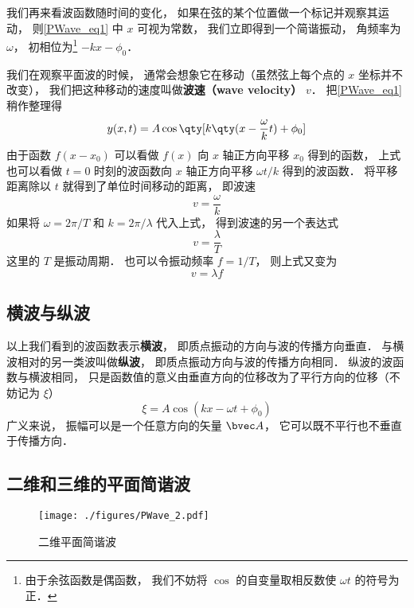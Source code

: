 我们再来看波函数随时间的变化， 如果在弦的某个位置做一个标记并观察其运动， 则\autoref{PWave_eq1} 中 $x$ 可视为常数， 我们立即得到一个简谐振动， 角频率为 $\omega$， 初相位为\footnote{由于余弦函数是偶函数， 我们不妨将 $\cos$ 的自变量取相反数使 $\omega t$ 的符号为正．} $-kx - \phi_0$．

我们在观察平面波的时候， 通常会想象它在移动（虽然弦上每个点的 $x$ 坐标并不改变）， 我们把这种移动的速度叫做\textbf{波速（wave velocity）} $v$． 把\autoref{PWave_eq1} 稍作整理得
\begin{equation}
y(x, t) = A\cos \qty[k \qty(x - \frac{\omega}{k} t) + \phi_0]
\end{equation}
由于函数 $f(x - x_0)$ 可以看做 $f(x)$ 向 $x$ 轴正方向平移 $x_0$ 得到的函数， 上式也可以看做 $t = 0$ 时刻的波函数向 $x$ 轴正方向平移 $\omega t/k$ 得到的波函数． 将平移距离除以 $t$ 就得到了单位时间移动的距离， 即波速
\begin{equation}
v = \frac{\omega}{k}
\end{equation}
如果将 $\omega = 2\pi/T$ 和 $k = 2\pi/\lambda$ 代入上式， 得到波速的另一个表达式
\begin{equation}
v = \frac{\lambda}{T}
\end{equation}
这里的 $T$ 是振动周期． 也可以令振动频率 $f = 1/T$， 则上式又变为
\begin{equation}
v = \lambda f
\end{equation}

\subsection{横波与纵波}
以上我们看到的波函数表示\textbf{横波}， 即质点振动的方向与波的传播方向垂直． 与横波相对的另一类波叫做\textbf{纵波}， 即质点振动方向与波的传播方向相同． 纵波的波函数与横波相同， 只是函数值的意义由垂直方向的位移改为了平行方向的位移（不妨记为 $\xi$）
\begin{equation}
\xi = A \cos(k x - \omega t + \phi_0)
\end{equation}
广义来说， 振幅可以是一个任意方向的矢量 $\bvec A$， 它可以既不平行也不垂直于传播方向．

\subsection{二维和三维的平面简谐波}
 

\begin{figure}[ht]
\centering
\texttt{[image: ./figures/PWave\_2.pdf]}
\caption{二维平面简谐波} \label{PWave_fig2}
\end{figure}

